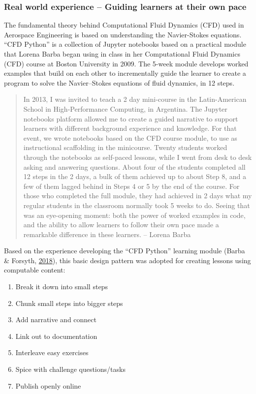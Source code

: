 \documentclass[]{book}
\providecommand{\tightlist}{%
  \setlength{\itemsep}{0pt}\setlength{\parskip}{0pt}}
\begin{document}
\hypertarget{real-world-experience-guiding-learners-at-their-own-pace}{%
\subsubsection{Real world experience -- Guiding learners at their own pace}\label{real-world-experience-guiding-learners-at-their-own-pace}}

The fundamental theory behind Computational Fluid Dynamics (CFD) used in
Aerospace Engineering is based on understanding the Navier-Stokes equations.
``CFD Python'' is a collection of Jupyter notebooks based on a practical module
that Lorena Barba began using in class in her Computational Fluid Dynamics (CFD) course at
Boston University in 2009. The 5-week module develops worked examples that build
on each other to incrementally guide the learner to create a program to solve
the Navier--Stokes equations of fluid dynamics, in 12 steps.

\begin{quote}
In 2013, I was invited to teach a 2 day mini-course in the Latin-American
School in High-Performance Computing, in Argentina. The Jupyter notebooks
platform allowed me to create a guided narrative to support learners with
different background experience and knowledge. For that event, we wrote
notebooks based on the CFD course module, to use as instructional scaffolding
in the minicourse. Twenty students worked through the notebooks as self-paced
lessons, while I went from desk to desk asking and answering questions. About
four of the students completed all 12 steps in the 2 days, a bulk of them
achieved up to about Step 8, and a few of them lagged behind in Steps 4 or 5
by the end of the course. For those who completed the full module, they had
achieved in 2 days what my regular students in the classroom normally took 5
weeks to do. Seeing that was an eye-opening moment: both the power of worked
examples in code, and the ability to allow learners to follow their own pace
made a remarkable difference in these learners. -- Lorena Barba
\end{quote}

Based on the experience developing the ``CFD Python'' learning module (Barba \& Forsyth, \protect\hyperlink{ref-barbacfd}{2018}),
this basic design pattern was adopted for creating lessons using computable
content:

\begin{enumerate}
\def\labelenumi{\arabic{enumi}.}
\tightlist
\item
  Break it down into small steps
\item
  Chunk small steps into bigger steps
\item
  Add narrative and connect
\item
  Link out to documentation
\item
  Interleave easy exercises
\item
  Spice with challenge questions/tasks
\item
  Publish openly online
\end{enumerate}
\end{document}
